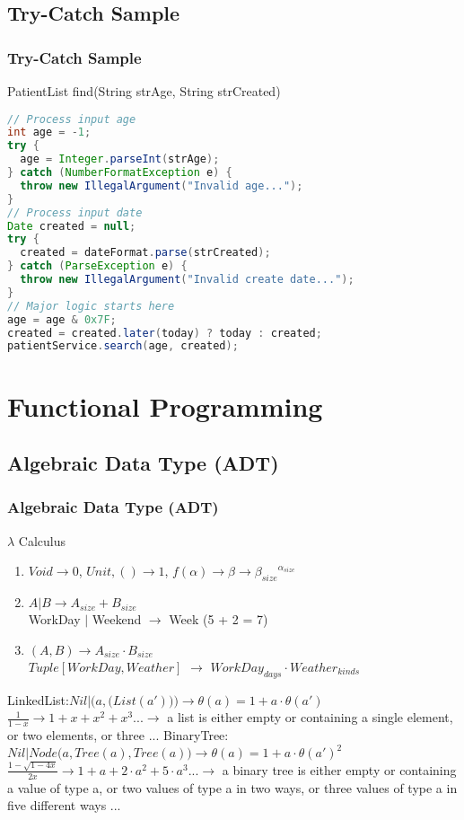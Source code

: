 \documentclass{beamer}
\begin{document}
\subsection{Try-Catch Sample}
\begin{frame}[fragile]
  \frametitle{Try-Catch Sample}
PatientList find(String strAge, String strCreated)
\begin{lstlisting}[language=Java]
// Process input age
int age = -1;
try {
  age = Integer.parseInt(strAge);
} catch (NumberFormatException e) {
  throw new IllegalArgument("Invalid age...");
}
// Process input date
Date created = null;
try {
  created = dateFormat.parse(strCreated);
} catch (ParseException e) {
  throw new IllegalArgument("Invalid create date...");
}
// Major logic starts here
age = age & 0x7F;
created = created.later(today) ? today : created;
patientService.search(age, created);
\end{lstlisting}
\end{frame}

\section{Functional Programming}
\subsection{Algebraic Data Type (ADT)}
\begin{frame}
  \frametitle{Algebraic Data Type (ADT)}
  \begin{block}{$\lambda$ Calculus} %
    \begin{enumerate}
    \item $Void \rightarrow 0$, $Unit, () \rightarrow 1$, $f(\alpha) \rightarrow \beta \rightarrow {\beta_{size}}^{\alpha_{size}}$
    \item $A | B \rightarrow A_{size} + B_{size}$
    \\ WorkDay $|$ Weekend $\rightarrow$ Week (5 + 2 = 7)
    \item $(A, B) \rightarrow A_{size} \cdot B_{size}$
    \\ $Tuple\left [WorkDay, Weather\right]$ $\rightarrow$ $WorkDay_{days} \cdot Weather_{kinds}$
    \end{enumerate}
  \end{block}
  \begin{example} %
  \alert{LinkedList:}$Nil | \Big(a, \big(List({a}')\big)\Big) \rightarrow \theta(a) = 1 + a \cdot \theta({a}')$ 
  $\frac{1}{1-x} \rightarrow 1+x+x^2+x^3... \rightarrow$ a list is either empty or containing a single element, or two elements, or three ...
  \alert{BinaryTree:}$Nil | Node\big(a, Tree(a), Tree(a)\big) \rightarrow \theta(a) = 1 + a \cdot \theta({a}')^2$ 
  $\frac{1-\sqrt{1-4x}}{2x} \rightarrow 1+a+2\cdot a^2 + 5 \cdot a^3 ... \rightarrow$ a binary tree is either empty or containing a value of type a, or two values of type a in two ways, or three values of type a in five different ways ...
  \end{example} 
\end{frame}
\end{document}
